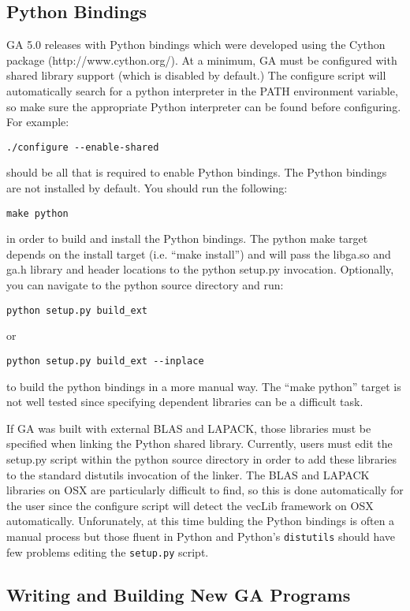 \subsection{Python Bindings}

GA 5.0 releases with Python bindings which were developed using the Cython
package (http://www.cython.org/). At a minimum, GA must be configured with
shared library support (which is disabled by default.) The configure script
will automatically search for a python interpreter in the PATH environment
variable, so make sure the appropriate Python interpreter can be found before
configuring. For example: 
\begin{verbatim}
./configure --enable-shared
\end{verbatim}
should be all that is required to enable Python bindings. The Python bindings
are not installed by default. You should run the following: 
\begin{verbatim}
make python
\end{verbatim}
in order to build and install the Python bindings. The python make target
depends on the install target (i.e. ``make install'') and will pass the
libga.so and ga.h library and header locations to the python setup.py
invocation. Optionally, you can navigate to the python source directory and
run: 
\begin{verbatim}
python setup.py build_ext
\end{verbatim}
or 
\begin{verbatim}
python setup.py build_ext --inplace
\end{verbatim}
to build the python bindings in a more manual way. The ``make python'' target
is not well tested since specifying dependent libraries can be a difficult
task. 

If GA was built with external BLAS and LAPACK, those libraries must be
specified when linking the Python shared library. Currently, users must edit
the setup.py script within the python source directory in order to add these
libraries to the standard distutils invocation of the linker. The BLAS and
LAPACK libraries on OSX are particularly difficult to find, so this is done
automatically for the user since the configure script will detect the vecLib
framework on OSX automatically.  Unforunately, at this time bulding the Python
bindings is often a manual process but those fluent in Python and Python's
\texttt{distutils} should have few problems editing the \texttt{setup.py}
script. 

\subsection{Writing and Building New GA Programs}

